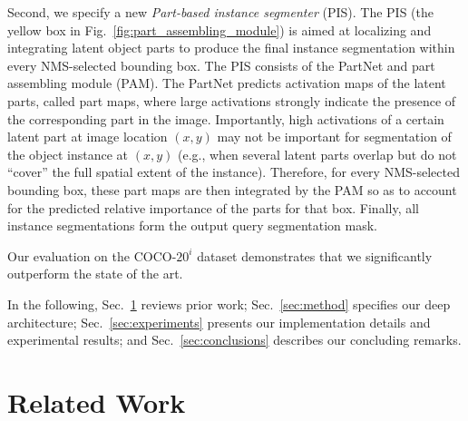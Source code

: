 \documentclass[final]{cvpr}
\begin{document}
Second, we specify a new {\em Part-based instance segmenter} (PIS). The PIS (the yellow box in Fig.~\ref{fig:part_assembling_module}) is aimed at localizing and integrating latent object parts to produce the final instance segmentation within every NMS-selected  bounding box. The PIS consists of the PartNet and part assembling module (PAM). The PartNet predicts activation maps of the latent parts, called part maps, where large activations strongly indicate the presence of the corresponding part in the image. Importantly, high activations of a certain latent part at image location $(x,y)$ may not be important for segmentation of the object instance at $(x,y)$ (e.g., when several latent parts overlap but do not ``cover'' the full spatial extent of the instance). Therefore, for every NMS-selected  bounding box, these part maps are then integrated by the PAM so as to account for the predicted relative importance of the parts for that box. Finally, all instance segmentations form the output query segmentation mask.



Our evaluation on the COCO-$20^i$ dataset \cite{michaelis2018one} demonstrates that we significantly outperform the state of the art. 

In the following, Sec.~\ref{sec:related_work} reviews prior work; Sec.~\ref{sec:method} specifies our deep architecture; 
Sec.~\ref{sec:experiments} presents our implementation details and experimental results; and Sec.~\ref{sec:conclusions} describes our concluding remarks.






\section{Related Work}
\label{sec:related_work}

\end{document}
